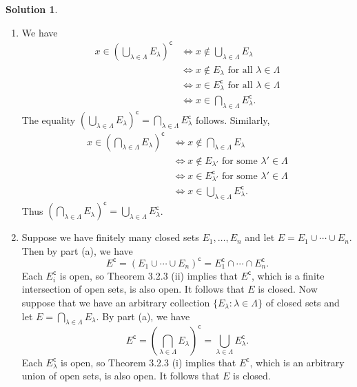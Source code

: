\documentclass[12pt]{article}
\theoremstyle{definition}
\theoremstyle{exercise}
\theoremstyle{solution}
\newtheorem*{solution}{Solution}
\newcommand{\setcomp}[1]{#1^{\mathsf{c}}}
\begin{document}
\begin{solution}
    \begin{enumerate}
        \item We have
        \begin{align*}
            x \in \setcomp{\left( \bigcup_{\lambda \in \Lambda} E_{\lambda} \right)} &\iff x \not\in \bigcup_{\lambda \in \Lambda} E_{\lambda} \\[2mm]
            &\iff x \not\in E_{\lambda} \text{ for all } \lambda \in \Lambda \\[2mm]
            &\iff x \in \setcomp{E_{\lambda}} \text{ for all } \lambda \in \Lambda \\[2mm]
            &\iff x \in \bigcap_{\lambda \in \Lambda} \setcomp{E_{\lambda}}.
        \end{align*}
        The equality \( \setcomp{\left( \bigcup_{\lambda \in \Lambda} E_{\lambda} \right)} = \bigcap_{\lambda \in \Lambda} \setcomp{E_{\lambda}} \) follows. Similarly,
        \begin{align*}
            x \in \setcomp{\left( \bigcap_{\lambda \in \Lambda} E_{\lambda} \right)} &\iff x \not\in \bigcap_{\lambda \in \Lambda} E_{\lambda} \\[2mm]
            &\iff x \not\in E_{\lambda'} \text{ for some } \lambda' \in \Lambda \\[2mm]
            &\iff x \in \setcomp{E_{\lambda'}} \text{ for some } \lambda' \in \Lambda \\[2mm]
            &\iff x \in \bigcup_{\lambda \in \Lambda} \setcomp{E_{\lambda}}.
        \end{align*}
        Thus \( \setcomp{\left( \bigcap_{\lambda \in \Lambda} E_{\lambda} \right)} = \bigcup_{\lambda \in \Lambda} \setcomp{E_{\lambda}} \).

        \item Suppose we have finitely many closed sets \( E_1, \ldots, E_n \) and let \( E = E_1 \cup \cdots \cup E_n \). Then by part (a), we have
        \[
            \setcomp{E} = \setcomp{(E_1 \cup \cdots \cup E_n)} = \setcomp{E_1} \cap \cdots \cap \setcomp{E_n}.
        \]
        Each \( \setcomp{E_i} \) is open, so Theorem 3.2.3 (ii) implies that \( \setcomp{E} \), which is a finite intersection of open sets, is also open. It follows that \( E \) is closed. Now suppose that we have an arbitrary collection \( \{ E_{\lambda} : \lambda \in \Lambda \} \) of closed sets and let \( E = \bigcap_{\lambda \in \Lambda} E_{\lambda} \). By part (a), we have
        \[
            \setcomp{E} = \setcomp{\left( \bigcap_{\lambda \in \Lambda} E_{\lambda} \right)} = \bigcup_{\lambda \in \Lambda} \setcomp{E_{\lambda}}.
        \]
        Each \( \setcomp{E_{\lambda}} \) is open, so Theorem 3.2.3 (i) implies that \( \setcomp{E} \), which is an arbitrary union of open sets, is also open. It follows that \( E \) is closed.
    \end{enumerate}
\end{solution}
\end{document}
